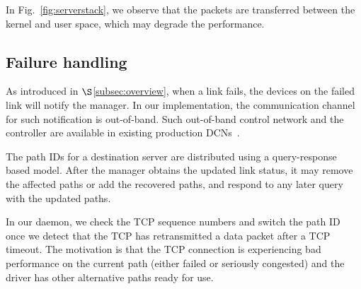 In Fig.~\ref{fig:serverstack}, we observe that the packets are transferred between the kernel and user space, which may degrade the performance. 

\subsection{Failure handling}\label{subsec:failure}
As introduced in $\S$\ref{subsec:overview}, when a link fails, the devices on the failed link will notify the \sys manager. In our implementation, the communication channel for such notification is out-of-band. Such out-of-band control network and the controller are available in existing production DCNs~\cite{netpilot}.



The path IDs for a destination server are distributed using a query-response based model. After the \sys manager obtains the updated link status, it may remove the affected paths or add the recovered paths, and respond to any later query with the updated paths.



 In our \sys daemon, we check the TCP sequence numbers and switch the path ID once we detect that the TCP has retransmitted a data packet after a TCP timeout. The motivation is that the TCP connection is experiencing bad performance on the current path (either failed or seriously congested) and the \sys driver has other alternative paths ready for use. 


